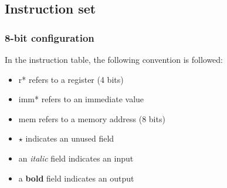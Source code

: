 \documentclass[a4paper,12pt]{article}
\begin{document}
\subsection{Instruction set}
\subsubsection{8-bit configuration}

In the instruction table, the following convention is followed:
\begin{itemize}
    \item r* refers to a register (4 bits)
    \item imm* refers to an immediate value
    \item mem refers to a memory address (8 bits)
    \item $\star$ indicates an unused field
    \item an \textit{italic} field indicates an input
    \item a \textbf{bold} field indicates an output
\end{itemize}
\end{document}
